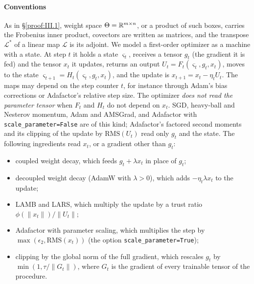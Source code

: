 \paragraph{Conventions}
As in \S\ref{proof:III.1}, weight space $\Theta=\mathbb{R}^{m\times n}$, or a product of such boxes, carries the Frobenius inner
product, covectors are written as matrices, and the transpose $\mathcal L^*$ of a linear map $\mathcal L$ is its adjoint.
We model a first-order optimizer as a machine with a state. At step $t$ it holds a state $\varsigma_t$, receives a tensor
$g_t$ (the gradient it is fed) and the tensor $x_t$ it updates, returns an output $U_t=F_t(\varsigma_t,g_t,x_t)$, moves to
the state $\varsigma_{t+1}=H_t(\varsigma_t,g_t,x_t)$, and the update is $x_{t+1}=x_t-\eta_tU_t$. The maps may depend on the
step counter $t$, for instance through Adam's bias corrections or Adafactor's relative step size. The optimizer
\emph{does not read the parameter tensor} when $F_t$ and $H_t$ do not depend on $x_t$. SGD, heavy-ball and Nesterov
momentum, Adam and AMSGrad, and Adafactor with \texttt{scale\_\allowbreak parameter=False} are of this kind; Adafactor's
factored second moments and its clipping of the update by $\mathrm{RMS}(U_t)$ read only $g_t$ and the state. The
following ingredients read $x_t$, or a gradient other than $g_t$:
\begin{itemize}
  \item coupled weight decay, which feeds $g_t+\lambda x_t$ in place of $g_t$;
  \item decoupled weight decay (AdamW with $\lambda>0$), which adds $-\eta_t\lambda x_t$ to the update;
  \item LAMB and LARS, which multiply the update by a trust ratio $\phi(\lVert x_t\rVert)/\lVert U_t\rVert$;
  \item Adafactor with parameter scaling, which multiplies the step by $\max(\epsilon_2,\mathrm{RMS}(x_t))$ (the option
  \texttt{scale\_\allowbreak parameter=\allowbreak True});
  \item clipping by the global norm of the full gradient, which rescales $g_t$ by $\min(1,\tau/\lVert G_t\rVert)$, where
  $G_t$ is the gradient of every trainable tensor of the procedure.
\end{itemize}

